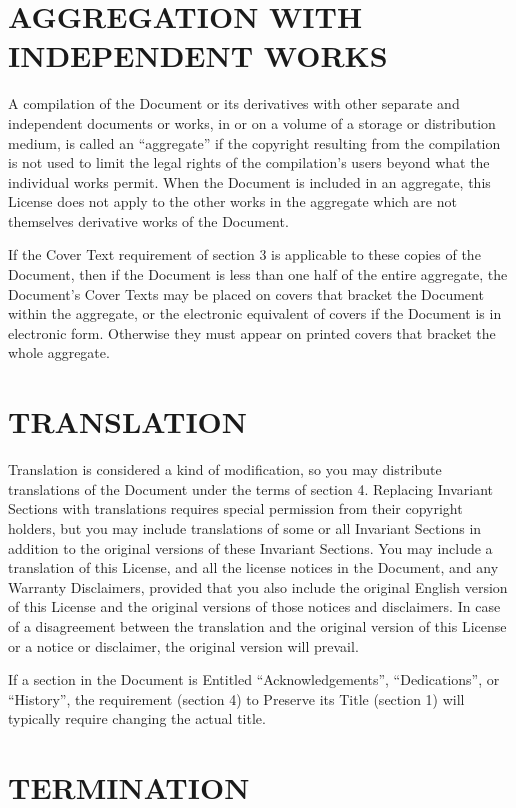 \section{AGGREGATION WITH INDEPENDENT WORKS}

A compilation of the Document or its derivatives with
other separate and independent documents or works, in
or on a volume of a storage or distribution medium, is
called an “aggregate” if the copyright resulting from
the compilation is not used to limit the legal rights of
the compilation’s users beyond what the individual works
permit. When the Document is included in an aggregate, this
License does not apply to the other works in the aggregate
which are not themselves derivative works of the Document.

If the Cover Text requirement of section 3 is applicable to
these copies of the Document, then if the Document is less
than one half of the entire aggregate, the Document’s Cover
Texts may be placed on covers that bracket the Document within
the aggregate, or the electronic equivalent of covers if the
Document is in electronic form. Otherwise they must appear
on printed covers that bracket the whole aggregate.


\section{TRANSLATION}

Translation is considered a kind of modification, so you may
distribute translations of the Document under the terms of
section 4. Replacing Invariant Sections with translations
requires special permission from their copyright holders,
but you may include translations of some or all Invariant
Sections in addition to the original versions of these
Invariant Sections. You may include a translation of this
License, and all the license notices in the Document, and
any Warranty Disclaimers, provided that you also include the
original English version of this License and the original
versions of those notices and disclaimers. In case of a
disagreement between the translation and the original version
of this License or a notice or disclaimer, the original
version will prevail.

If a section in the Document is Entitled
“Acknowledgements”, “Dedications”, or “History”,
the requirement (section 4) to Preserve its Title (section 1)
will typically require changing the actual title.

\section{TERMINATION}

